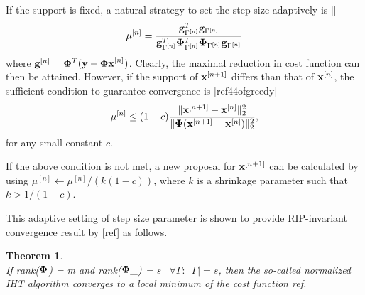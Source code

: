 \documentclass{article}
\newtheorem{theorem}{Theorem}
\begin{document}
If the support is fixed, a natural strategy to set the step size adaptively is []
\begin{equation}\label{step_size}
   \mu^{[n]} = \frac{{\bf g}^T_{\Gamma^{[n]}}{\bf g}_{\Gamma^{[n]}}}{{\bf g}^T_{\Gamma^{[n]}}{\bf \Phi}^T_{\Gamma^{[n]}}{\bf \Phi}_{\Gamma^{[n]}}{\bf g}_{\Gamma^{[n]}}}
\end{equation}
where ${\bf g}^{[n]} = {\bf \Phi}^T({\bf y}-{\bf \Phi x}^{[n]})$. Clearly, the maximal reduction in cost function can then be attained. However, if the support of ${\bf x}^{[n+1]}$ differs than that of ${\bf x}^{[n]}$, the sufficient condition to guarantee convergence is [ref44ofgreedy]
\begin{equation}
    \mu^{[n]} \leq(1-c) \frac{\|{\bf x}^{[n+1]}-{\bf x}^{[n]} \|_2^2}{\|{\bf \Phi}({\bf x}^{[n+1]}-{\bf x}^{[n]}) \|_2^2},
\end{equation}
for any small constant $c$.

If the above condition is not met, a new proposal for ${\bf x}^{[n+1]}$ can be calculated by using $\mu^{[n]}\leftarrow{\mu^{[n]}/(k(1-c))}$, where $k$ is a shrinkage parameter such that $k>1/(1-c)$.

This adaptive setting of step size parameter is shown to provide RIP-invariant convergence result by [ref] as follows.
\begin{theorem}
{\rm{\cite{niht}}}\\
If rank({${\bf \Phi}$}) = m and rank(${\bf \Phi}$_{\Gamma}) = s \ $\forall \Gamma:\ |\Gamma| = s$, then the so-called normalized IHT algorithm converges to a local minimum of the cost function ref.
\end{theorem}
\end{document}
